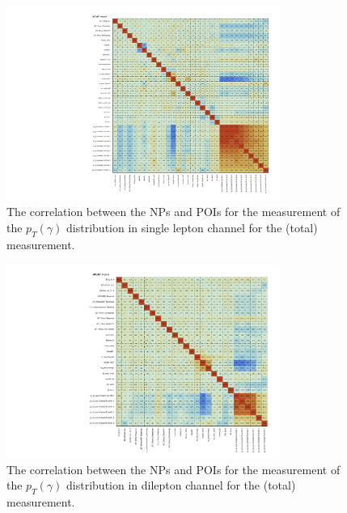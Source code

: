 \begin{figure}[ht]
  \centering
  \includegraphics[width=0.8\textwidth]{figures/diff_xsec/ljet_tty_total_mu_blinded/correlations/tty1l_pt_all_syst/CorrMatrix.pdf}
  \caption{The correlation between the NPs and POIs for the measurement of 
  the $p_T(\gamma)$ distribution in single lepton channel for the \tty (total) measurement.}
  \label{fig:NP-corr_ljet_mu_blinded_tty_total}
\end{figure}
\FloatBarrier


\begin{figure}[ht]
  \centering
  \includegraphics[width=0.8\textwidth]{figures/diff_xsec/dilep_tty_total_mu_blinded/correlations/tty2l_pt_all_syst/CorrMatrix.pdf}
  \caption{The correlation between the NPs and POIs for the measurement of 
  the $p_T(\gamma)$ distribution in dilepton channel for the \tty(total) measurement.}
  \label{fig:NP-corr_dilep_mu_blinded_tty_total}
\end{figure}
\FloatBarrier


